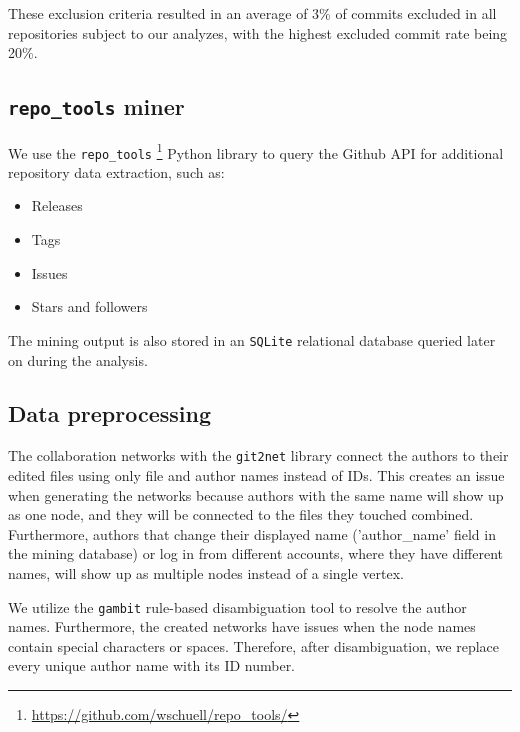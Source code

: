 These exclusion criteria resulted in an average of 3\% of commits excluded in all repositories subject to our analyzes, with the highest excluded commit rate being 20\%.

\subsection{\texttt{repo\_tools} miner} 

We use the \texttt{repo\_tools} \footnote{\url{https://github.com/wschuell/repo\_tools/}} Python library to query the Github API for additional repository data extraction, such as:

\begin{itemize}
    \item Releases
    \item Tags
    \item Issues
    \item Stars and followers
\end{itemize}

The mining output is also stored in an \texttt{SQLite} relational database queried later on during the analysis. 


\subsection{Data preprocessing}

The collaboration networks with the \texttt{git2net} library connect the authors to their edited files using only file and author names instead of IDs. This creates an issue when generating the networks because authors with the same name will show up as one node, and they will be connected to the files they touched combined. Furthermore, authors that change their displayed name ('author\_name' field in the mining database) or log in from different accounts, where they have different names, will show up as multiple nodes instead of a single vertex.

We utilize the \texttt{gambit} \cite{goteGambitOpenSource2021} rule-based disambiguation tool to resolve the author names. Furthermore, the created networks have issues when the node names contain special characters or spaces. Therefore, after disambiguation, we replace every unique author name with its ID number.

